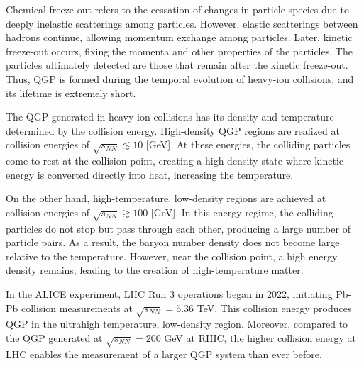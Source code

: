         Chemical freeze-out refers to the cessation of changes in particle species due to deeply inelastic scatterings among particles. However, elastic scatterings between hadrons continue, allowing momentum exchange among particles. Later, kinetic freeze-out occurs, fixing the momenta and other properties of the particles. The particles ultimately detected are those that remain after the kinetic freeze-out. Thus, QGP is formed during the temporal evolution of heavy-ion collisions, and its lifetime is extremely short.  
        
        
        
        The QGP generated in heavy-ion collisions has its density and temperature determined by the collision energy. High-density QGP regions are realized at collision energies of $\sqrt{s_{NN}} \lesssim 10$ [GeV]. At these energies, the colliding particles come to rest at the collision point, creating a high-density state where kinetic energy is converted directly into heat, increasing the temperature.  
        
        On the other hand, high-temperature, low-density regions are achieved at collision energies of $\sqrt{s_{NN}} \gtrsim 100$ [GeV]. In this energy regime, the colliding particles do not stop but pass through each other, producing a large number of particle pairs. As a result, the baryon number density does not become large relative to the temperature. However, near the collision point, a high energy density remains, leading to the creation of high-temperature matter.  
        
        In the ALICE experiment, LHC Run 3 operations began in 2022, initiating Pb-Pb collision measurements at $\sqrt{s_{NN}} = 5.36$ TeV. This collision energy produces QGP in the ultrahigh temperature, low-density region. Moreover, compared to the QGP generated at $\sqrt{s_{NN}} = 200$ GeV at RHIC, the higher collision energy at LHC enables the measurement of a larger QGP system than ever before.

